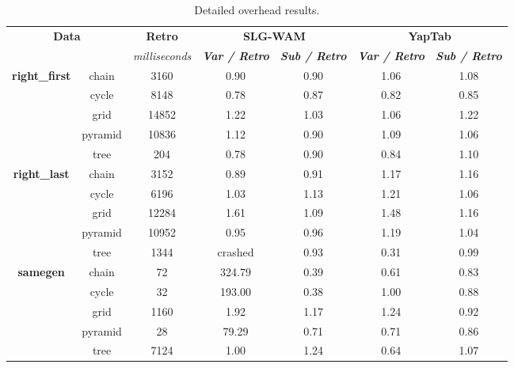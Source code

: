 \begin{table}[ht]
\centering
\footnotesize{
  \begin{tabular}{cc|c|cc|cc}
   \hline
    \hline
    \multicolumn{2}{c|}{\multirow{2}{*}{\small{\textbf{Data}}}} & \textbf{\small{Retro}} & \multicolumn{2}{c|}{\small{\textbf{SLG-WAM}}} & \multicolumn{2}{c}{\small{\textbf{YapTab}}} \\
     \multicolumn{2}{c|}{} & \scriptsize{\textit{milliseconds}} & \textbf{\textit{\scriptsize{Var / Retro}}} & \textbf{\textit{\scriptsize{Sub / Retro}}} & \textbf{\textit{\scriptsize{Var / Retro}}} & \textbf{\textit{\scriptsize{Sub / Retro}}} \\
   \hline
   \hline
\multirow{5}{*}{\textbf{right\_first}} &  chain &  3160 &  0.90  &  0.90  &  1.06 & 1.08 \\
&  cycle &  8148 &  0.78  &  0.87  &  0.82 & 0.85 \\
&  grid &  14852 &  1.22  &  1.03  &  1.06 & 1.22 \\
&  pyramid &  10836 &  1.12  &  0.90  &  1.09 & 1.06 \\
&  tree &  204 &  0.78  &  0.90  &  0.84 & 1.10 \\
\hline
\multirow{5}{*}{\textbf{right\_last}} &  chain &  3152 &  0.89  &  0.91  &  1.17 & 1.16 \\
&  cycle &  6196 &  1.03  &  1.13  &  1.21 & 1.06 \\
&  grid &  12284 &  1.61  &  1.09  &  1.48 & 1.16 \\
&  pyramid &  10952 &  0.95  &  0.96  &  1.19 & 1.04 \\
&  tree &  1344 &  \scriptsize{crashed}  &  0.93  &  0.31 & 0.99 \\
\hline
\multirow{5}{*}{\textbf{samegen}} &  chain &  72 &  324.79  &  0.39  &  0.61 & 0.83 \\
&  cycle &  32 &  193.00  &  0.38  &  1.00 & 0.88 \\
&  grid &  1160 &  1.92  &  1.17  &  1.24 & 0.92 \\
&  pyramid &  28 &  79.29  &  0.71  &  0.71 & 0.86 \\
&  tree &  7124 &  1.00  &  1.24  &  0.64 & 1.07 \\
\hline
\hline
\end{tabular}
}
\caption{Detailed overhead results.}
\label{tbl:overhead_detail_tst2}
\end{table}